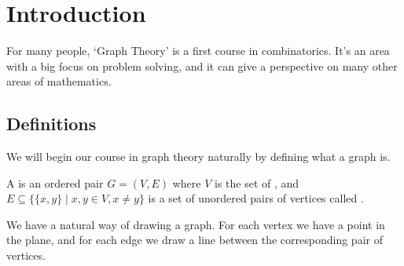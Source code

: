 \documentclass[a4paper]{scrreprt}
\begin{document}



\chapter{Introduction}

For many people, `Graph Theory' is a first course in combinatorics. It's an area with a big focus on problem solving, and it can give a perspective on many other areas of mathematics.  

\section{Definitions}

We will begin our course in graph theory naturally by defining what a graph is.

\begin{definition}[Graph]
	A  is an ordered pair $G = (V, E)$ where $V$ is the set of , and $E \subseteq \{ \{x,y\} \mid x, y \in V, x \neq y \}$ is a set of unordered pairs of vertices called .
\end{definition}

We have a natural way of drawing a graph. For each vertex we have a point in the plane, and for each edge we draw a line between the corresponding pair of vertices.
\end{document}
